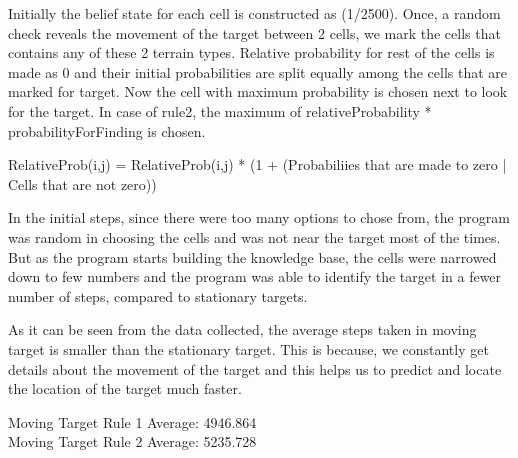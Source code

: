 \documentclass[a4paper]{article}
\begin{document}
Initially the belief state for each cell is constructed as (1/2500). Once, a random check reveals the movement of the target between 2 cells, we mark the cells that contains any of these 2 terrain types. Relative probability for rest of the cells is made as 0 and their initial probabilities are split equally among the cells that are marked for target. Now the cell with maximum probability is chosen next to look for the target. In case of rule2, the maximum of relativeProbability * probabilityForFinding is chosen. 

\begin{center}
RelativeProb(i,j) = RelativeProb(i,j) * (1 + (Probabiliies that are made to zero | Cells that are not zero))
\end{center}

In the initial steps, since there were too many options to chose from, the program was random in choosing the cells and was not near the target most of the times. But as the program starts building the knowledge base, the cells were narrowed down to few numbers and the program was able to identify the target in a fewer number of steps, compared to stationary targets.

As it can be seen from the data collected, the average steps taken in moving target is smaller than the  stationary target. This is because, we constantly get details about the movement of the target and this helps us to predict and locate the location of the target much faster.

Moving Target Rule 1 Average: 4946.864\\
Moving Target Rule 2 Average: 5235.728
\end{document}
